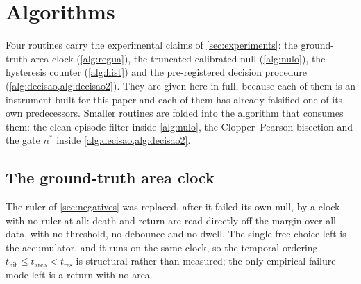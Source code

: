 \documentclass[11pt]{article}
\theoremstyle{definition}
\theoremstyle{remark}
\newcommand{\thit}{t_{\mathrm{hit}}}
\begin{document}
\section{Algorithms}\label{app:algorithms}

Four routines carry the experimental claims of \cref{sec:experiments}: the
ground-truth area clock (\cref{alg:regua}), the truncated calibrated null
(\cref{alg:nulo}), the hysteresis counter (\cref{alg:hist}) and the
pre-registered decision procedure (\cref{alg:decisao,alg:decisao2}). They are
given here in
full, because each of them is an instrument built for this paper and each of them
has already falsified one of its own predecessors. Smaller routines are folded
into the algorithm that consumes them: the clean-episode filter inside
\cref{alg:nulo}, the Clopper--Pearson bisection and the gate $n^\ast$ inside
\cref{alg:decisao,alg:decisao2}.

\subsection{The ground-truth area clock}\label{app:alg1}

The ruler of \cref{sec:negatives} was replaced, after it failed its own null, by
a clock with no ruler at all: death and return are read directly off the margin
over all data, with no threshold, no debounce and no dwell. The single free
choice left is the accumulator, and it runs on the same clock, so the temporal
ordering $\thit\le t_{\mathrm{area}}<t_{\mathrm{res}}$ is structural rather than
measured; the only empirical failure mode left is a return with no area.
\end{document}
